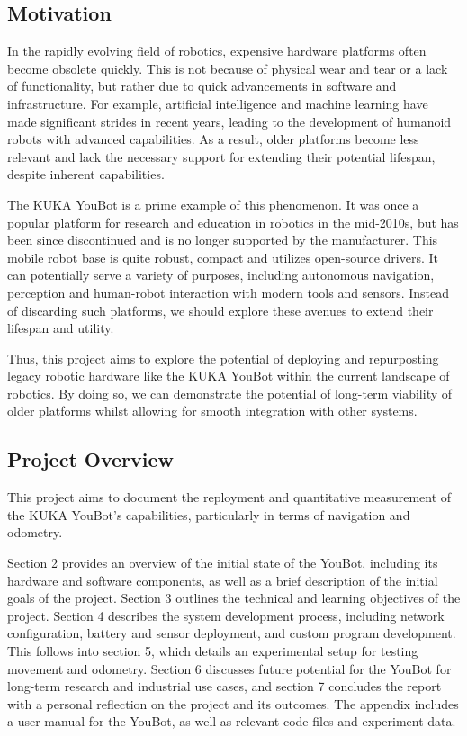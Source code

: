 \documentclass[a4paper, 12pt]{article}
\newif\ifshownotes
\newcommand{\notes}[1]{\ifshownotes\textcolor{blue}{#1}\fi}
\begin{document}
    \subsection{Motivation}

    \notes{Section 1 done. draft \#1}

    In the rapidly evolving field of robotics, expensive hardware platforms often become obsolete quickly. This is not because of physical wear and tear or a lack of functionality, but rather due to quick advancements in software and infrastructure. For example, artificial intelligence and machine learning have made significant strides in recent years, leading to the development of humanoid robots with advanced capabilities. As a result, older platforms become less relevant and lack the necessary support for extending their potential lifespan, despite inherent capabilities. 

    The KUKA YouBot is a prime example of this phenomenon. It was once a popular platform for research and education in robotics in the mid-2010s, but has been since discontinued and is no longer supported by the manufacturer. This mobile robot base is quite robust, compact and utilizes open-source drivers. It can potentially serve a variety of purposes, including autonomous navigation, perception and human-robot interaction with modern tools and sensors. Instead of discarding such platforms, we should explore these avenues to extend their lifespan and utility. 
    
    Thus, this project aims to explore the potential of deploying and repurposting legacy robotic hardware like the KUKA YouBot within the current landscape of robotics. By doing so, we can demonstrate the potential of long-term viability of older platforms whilst allowing for smooth integration with other systems. 

    \subsection{Project Overview}

    This project aims to document the reployment and quantitative measurement of the KUKA YouBot's capabilities, particularly in terms of navigation and odometry. 
    
    Section 2 provides an overview of the initial state of the YouBot, including its hardware and software components, as well as a brief description of the initial goals of the project. Section 3 outlines the technical and learning objectives of the project. Section 4 describes the system development process, including network configuration, battery and sensor deployment, and custom program development. This follows into section 5, which details an experimental setup for testing movement and odometry. Section 6 discusses future potential for the YouBot for long-term research and industrial use cases, and section 7 concludes the report with a personal reflection on the project and its outcomes. The appendix includes a user manual for the YouBot, as well as relevant code files and experiment data. 
      
\end{document}
